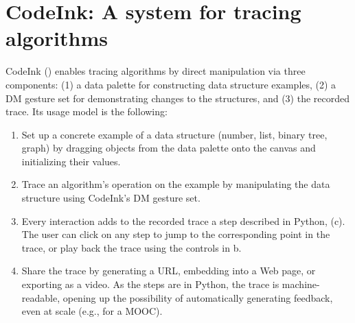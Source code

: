 

\section{CodeInk: A system for tracing algorithms}
CodeInk () enables
tracing algorithms by direct manipulation via 
three components: (1) a data palette for constructing data
structure examples, (2) a DM gesture set for demonstrating changes to the 
structures, and (3) the recorded trace.
Its usage model is the following:

\begin{enumerate}\itemsep0pt

\item Set up a concrete example of a data structure (number, list, binary tree,
graph) by dragging objects from the data palette onto the canvas and
initializing their values.

\item  Trace an algorithm's operation on the example by manipulating the data structure using CodeInk's DM gesture set.


\item Every interaction adds to the recorded trace a step described in 
Python, (c). The user can click on any step to
jump to the corresponding point in the trace, or play back the trace using the
controls in b.

\item Share the trace by generating a URL, embedding into a Web page, or
exporting as a video. As the steps are in Python, the trace is machine-readable, opening up the possibility of automatically generating feedback, even at scale (e.g., for a MOOC).

\end{enumerate}

